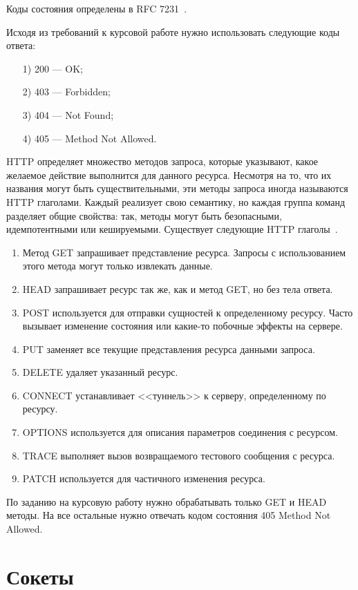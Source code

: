 \documentclass{bmstu}
\begin{document}
Коды состояния определены в RFC 7231~\cite{RfcStatus2014}.

Исходя из требований к курсовой работе нужно использовать следующие коды ответа:
\begin{enumerate}
\item[1)] 200 --- OK;
\item[2)] 403 --- Forbidden;
\item[3)] 404 --- Not Found;
\item[4)] 405 --- Method Not Allowed.
\end{enumerate}

HTTP определяет множество методов запроса, которые указывают, какое желаемое действие выполнится для данного ресурса. 
Несмотря на то, что их названия могут быть существительными, эти методы запроса иногда называются HTTP глаголами. 
Каждый реализует свою семантику, но каждая группа команд разделяет общие свойства: так, методы могут быть безопасными, идемпотентными или кешируемыми. 
Существует следующие HTTP глаголы~\cite{MdnHttpMethods2023}.
\begin{enumerate}
\item Метод GET запрашивает представление ресурса. 
Запросы с использованием этого метода могут только извлекать данные.
\item HEAD запрашивает ресурс так же, как и метод GET, но без тела ответа.
\item POST используется для отправки сущностей к определенному ресурсу. Часто вызывает изменение состояния или какие-то побочные эффекты на сервере.
\item PUT заменяет все текущие представления ресурса данными запроса.
\item DELETE удаляет указанный ресурс.
\item CONNECT устанавливает <<туннель>> к серверу, определенному по ресурсу.
\item OPTIONS используется для описания параметров соединения с ресурсом.
\item TRACE выполняет вызов возвращаемого тестового сообщения с ресурса.
\item PATCH используется для частичного изменения ресурса.
\end{enumerate}

По заданию на курсовую работу нужно обрабатывать только GET и HEAD методы. 
На все остальные нужно отвечать кодом состояния 405 Method Not Allowed.

\section{Сокеты}
\end{document}
